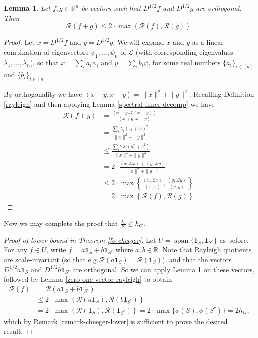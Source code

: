 \documentclass[a4paper,11pt]{article}
\newtheorem{lemma}[theorem]{Lemma}
\theoremstyle{definition}
\newcommand{\R}{\mathbb{R}}
\renewcommand{\L}{\mathcal{L}}
\newcommand{\rayleigh}[1]{\mathcal{R}\left(#1\right)}
\newcommand{\rayleighinner}[1]{\frac {\inner{#1}{\L #1}} {\inner{#1}{#1}} }
\newcommand{\inner}[2]{\left\langle #1, #2 \right\rangle}
\DeclareMathOperator{\spn}{span}
\begin{document}
\begin{lemma}\label{orthogonal-vectors-rayleigh}
Let $f, g \in \R^n$ be vectors such that $D^{1/2}f$ and $D^{1/2}g$ are orthogonal. Then
\[
\rayleigh{f + g} \le 2 \cdot \max \left\{\rayleigh{f}, \rayleigh{g} \right\}.
\]
\end{lemma}
\begin{proof}
Let $x = D^{1/2}f$ and $y = D^{1/2}g$. We will expand $x$ and $y$ as a linear combination of eigenvectors $\psi_1, \dots, \psi_n$ of $\L$ (with corresponding eigenvalues $\lambda_1, \dots, \lambda_n$), so that $x = \sum_i a_i \psi_i$ and $y = \sum_i b_i \psi_i$ for some real numbers $\{a_i\}_{i \in [n]}$ and $\{b_i\}_{i \in [n]}$.

By orthogonality we have $\inner{x + y}{x + y} = \|x\|^2 + \|y\|^2$. Recalling Definition \ref{rayleigh} and then applying Lemma \ref{spectral-inner-decomp} we have
\begin{align*}
\rayleigh{f + g} &= \frac{\inner{x + y}{\L(x + y)}}{\inner{x + y}{x + y}} \\
&= \frac{\sum_i \lambda_i(a_i + b_i)^2}{\|x\|^2 + \|y\|^2} \\
&\le \frac{\sum_i 2 \lambda_i (a_i^2 + b_i^2)}{\|x\|^2 + \|y\|^2} \\
&= 2 \cdot \frac{\inner{x}{\L x} + \inner{y}{\L y}}{\|x\|^2 + \|y\|^2} \\
&\le 2 \cdot \max \left\{\rayleighinner{x}, \rayleighinner{y} \right\} \\
&= 2 \cdot \max \left\{\rayleigh{f}, \rayleigh{g} \right\}.
\end{align*}
\end{proof}

Now we may complete the proof that $\frac{\lambda_2}{2} \le h_G$.

\begin{proof}[Proof of lower bound in Theorem \ref{fo-cheeger}]
Let $U = \spn\{\bm{1}_S, \bm{1}_{S^c}\}$ as before. For any $f \in U$, write $f = a\bm{1}_S + b\bm{1}_{S^c}$ where $a, b \in \R$. Note that Rayleigh quotients are scale-invariant (so that e.g $\rayleigh{a\bm{1}_S} = \rayleigh{\bm{1}_S}$), and that the vectors $D^{1/2}a\bm{1}_S$ and $D^{1/2}b\bm{1}_{S^c}$ are orthogonal. So we can apply Lemma \ref{orthogonal-vectors-rayleigh} on these vectors, followed by Lemma \ref{zero-one-vector-rayleigh} to obtain
\begin{align*}
\rayleigh{f} &= \rayleigh{a\bm{1}_S + b\bm{1}_{S^c}} \\
&\le 2 \cdot \max \left\{\rayleigh{a\bm{1}_S}, \rayleigh{b\bm{1}_{S^c}} \right\} \\
&=  2 \cdot \max \left\{\rayleigh{\bm{1}_S}, \rayleigh{\bm{1}_{S^c}} \right\} = 2 \cdot \max\{ \phi(S), \phi(S^c) \} = 2h_G,
\end{align*} which by Remark \ref{remark-cheeger-lower} is sufficient to prove the desired result.
\end{proof}
\end{document}
